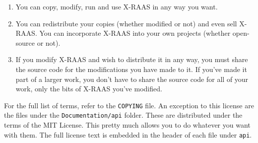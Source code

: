 \documentclass[a4paper,12pt]{article}
\begin{document}
\begin{enumerate}

\item You can copy, modify, run and use X-RAAS in any way you want.

\item You can redistribute your copies (whether modified or not) and even
sell X-RAAS. You can incorporate X-RAAS into your own projects (whether
open-source or not).

\item If you modify X-RAAS and wish to distribute it in any way, you must
share the source code for the modifications you have made to it. If
you've made it part of a larger work, you don't have to share the source
code for all of your work, only the bits of X-RAAS you've modified.

\end{enumerate}

\noindent For the full list of terms, refer to the \texttt{COPYING} file.
An exception to this license are the files under the
\texttt{Documentation/api} folder. These are distributed under the terms
of the MIT License. This pretty much allows you to do whatever you want
with them. The full license text is embedded in the header of each file
under \texttt{api}.
\end{document}
